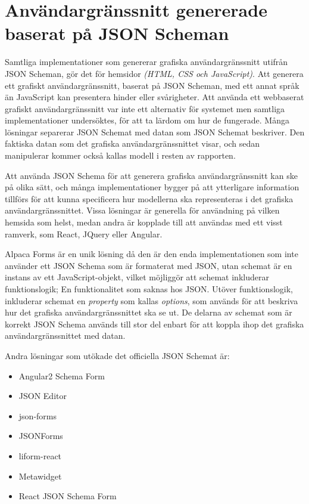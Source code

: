 \section{Användargränssnitt genererade baserat på JSON Scheman}
\label{sec:forarbete:gui-generering}
Samtliga implementationer som genererar grafiska användargränssnitt utifrån JSON Scheman, gör det för hemsidor \textit{(HTML, CSS och JavaScript)}. Att generera ett grafiskt användargränssnitt, baserat på JSON Scheman, med ett annat språk än JavaScript kan presentera hinder eller svårigheter. Att använda ett webbaserat grafiskt användargränssnitt var inte ett alternativ för systemet men samtliga implementationer undersöktes, för att ta lärdom om hur de fungerade. Många lösningar separerar JSON Schemat med datan som JSON Schemat beskriver. Den faktiska datan som det grafiska användargränssnittet visar, och sedan manipulerar kommer också kallas modell i resten av rapporten.

Att använda JSON Schema för att generera grafiska användargränssnitt kan ske på olika sätt, och många implementationer bygger på att ytterligare information tillförs för att kunna specificera hur modellerna ska representeras i det grafiska användargränssnittet. Vissa lösningar är generella för användning på vilken hemsida som helst, medan andra är kopplade till att användas med ett visst ramverk, som React, JQuery eller Angular.

Alpaca Forms är en unik lösning då den är den enda implementationen som inte använder ett JSON Schema som är formaterat med JSON, utan schemat är en instans av ett JavaScript-objekt, vilket möjliggör att schemat inkluderar funktionslogik; En funktionalitet som saknas hos JSON. Utöver funktionslogik, inkluderar schemat en \textit{property} som kallas \textit{options}, som används för att beskriva hur det grafiska användargränssnittet ska se ut. De delarna av schemat som är korrekt JSON Schema används till stor del enbart för att koppla ihop det grafiska användargränssnittet med datan. \cite{GitanaSoftwareInc.}

Andra lösningar som utökade det officiella JSON Schemat är:
\begin{itemize}
	\item Angular2 Schema Form \cite{MakinaCorpus}
	\item JSON Editor \cite{JeremyDorn}
	\item json-forms \cite{Brutusin.org}
	\item JSONForms \cite{EclipseSource}
	\item liform-react \cite{NachoMartin}
	\item Metawidget \cite{Metawidget}
	\item React JSON Schema Form \cite{MozillaServices}
\end{itemize}

